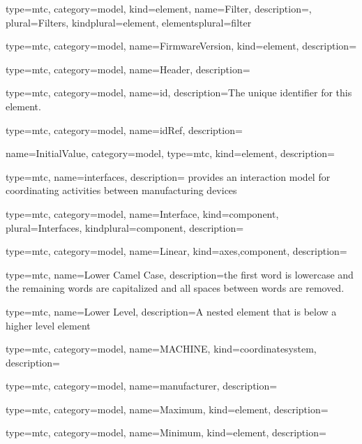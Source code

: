 {
  type=mtc,
  category=model,
  kind={element},
  name={Filter},
  description={},
  plural={Filters},
  kindplural={element},
  elementsplural={\gls{filter}}
}


{
  type=mtc,
  category=model,
  name={FirmwareVersion},
  kind={element},
  description={}
}


{
  type=mtc,
  category=model,
  name={Header},
  description={}
}


{
  type=mtc,
  category=model,
  name={id},
  description={The unique identifier for this element.}
}


{
  type=mtc,
  category=model,
  name={idRef},
  description={}
}


{
  name={InitialValue},
  category=model,
  type=mtc,
  kind={element},
  description={}
}


{
  type=mtc,
  name=interfaces,
  description={ provides an interaction model for coordinating activities between manufacturing devices}
}


{
  type=mtc,
  category=model,
  name={Interface},
  kind={component},
  plural={Interfaces},
  kindplural={component},
  description={}
}


{
  type=mtc,
  category=model,
  name={Linear},
  kind={axes,component},
  description={}
}


{
  type=mtc,
  name={Lower Camel Case},
  description={the first word is lowercase and the remaining words are capitalized and all spaces between words are removed.}
}


{
  type=mtc,
  name={Lower Level},
  description={A nested element that is below a higher level element}
}


{
  type=mtc,
  category=model,
  name={MACHINE},
  kind={coordinatesystem},
  description={}
}


{
  type=mtc,
  category=model,
  name={manufacturer},
  description={}
}


{
  type=mtc,
  category=model,
  name={Maximum},
  kind={element},
  description={}
}


{
  type=mtc,
  category=model,
  name={Minimum},
  kind={element},
  description={}
}


